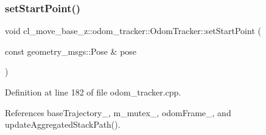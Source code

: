 \subsubsection{\texorpdfstring{set\+Start\+Point()}{setStartPoint()}\hspace{0.1cm}{\footnotesize\ttfamily [2/2]}}
{\footnotesize\ttfamily void cl\+\_\+move\+\_\+base\+\_\+z\+::odom\+\_\+tracker\+::\+Odom\+Tracker\+::set\+Start\+Point (\begin{DoxyParamCaption}\item[{const geometry\+\_\+msgs\+::\+Pose \&}]{pose }\end{DoxyParamCaption})}



Definition at line 182 of file odom\+\_\+tracker.\+cpp.



References base\+Trajectory\+\_\+, m\+\_\+mutex\+\_\+, odom\+Frame\+\_\+, and update\+Aggregated\+Stack\+Path().


